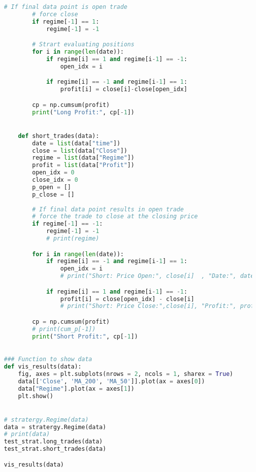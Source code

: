 \documentclass[11pt]{report}
\begin{document}
\begin{lstlisting}[language = python]
        # If final data point is open trade
        # force close
        if regime[-1] == 1:
            regime[-1] = -1

        # Strart evaluating positions
        for i in range(len(date)):
            if regime[i] == 1 and regime[i-1] == -1:
                open_idx = i

            if regime[i] == -1 and regime[i-1] == 1:
                profit[i] = close[i]-close[open_idx]

        cp = np.cumsum(profit)
        print("Long Profit:", cp[-1])


    def short_trades(data):
        date = list(data["time"])
        close = list(data["Close"])
        regime = list(data["Regime"])
        profit = list(data["Profit"])
        open_idx = 0
        close_idx = 0
        p_open = []
        p_close = []
    
        # If final data point results in open trade
        # force the trade to close at the closing price
        if regime[-1] == -1:
            regime[-1] = -1
            # print(regime)

        for i in range(len(date)):
            if regime[i] == -1 and regime[i-1] == 1:
                open_idx = i
                # print("Short: Price Open:", close[i]  , "Date:", date[i]  )

            if regime[i] == 1 and regime[i-1] == -1:
                profit[i] = close[open_idx] - close[i]
                # print("Short: Price Close:",close[i], "Profit:", profit[i], "Date:", date[i]  )

        cp = np.cumsum(profit)
        # print(cum_p[-1])
        print("Short Profit:", cp[-1])
        

### Function to show data
def vis_results(data):
    fig, axes = plt.subplots(nrows = 2, ncols = 1, sharex = True)
    data[['Close', 'MA_200', 'MA_50']].plot(ax = axes[0])
    data["Regime"].plot(ax = axes[1])
    plt.show()


# stratergy.Regime(data)
data = stratergy.Regime(data)
# print(data)
test_strat.long_trades(data)
test_strat.short_trades(data)

vis_results(data)









\end{lstlisting}
\end{document}

